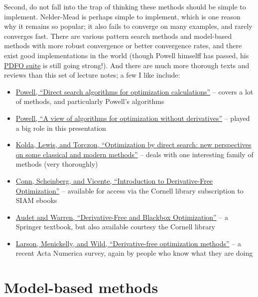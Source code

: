 \documentclass[12pt, leqno]{article} %
\providecommand{\tightlist}{%
  \setlength{\itemsep}{0pt}\setlength{\parskip}{0pt}}
\begin{document}
Second, do not fall into the trap of thinking these methods should be
simple to implement. Nelder-Mead is perhaps simple to implement, which
is one reason why it remains so popular; it also fails to converge on
many examples, and rarely converges fast. There are various pattern
search methods and model-based methods with more robust convergence or
better convergence rates, and there exist good implementations in the
world (though Powell himselff has passed, his
\href{https://www.pdfo.net/}{PDFO suite} is still going strong!). And
there are much more thorough texts and reviews than this set of lecture
notes; a few I like include:

\begin{itemize}
\tightlist
\item
  \href{https://doi.org/10.1017/S0962492900002841}{Powell, ``Direct
  search algorithms for optimization calculations''} -- covers a lot of
  methods, and particularly Powell's algorithms
\item
  \href{http://www.damtp.cam.ac.uk/user/na/NA_papers/NA2007_03.pdf}{Powell,
  ``A view of algorithms for optimization without derivatives''} --
  played a big role in this presentation
\item
  \href{https://epubs.siam.org/doi/10.1137/S003614450242889}{Kolda,
  Lewis, and Torczon, ``Optimization by direct search: new perspectives
  on some classical and modern methods''} -- deals with one interesting
  family of methods (very thoroughly)
\item
  \href{https://epubs-siam-org.proxy.library.cornell.edu/doi/book/10.1137/1.9780898718768}{Conn,
  Scheinberg, and Vicente, ``Introduction to Derivative-Free
  Optimization''} -- available for access via the Cornell library
  subscription to SIAM ebooks
\item
  \href{https://link-springer-com.proxy.library.cornell.edu/book/10.1007/978-3-319-68913-5}{Audet
  and Warren, ``Derivative-Free and Blackbox Optimization''} -- a
  Springer textbook, but also available courtesy the Cornell library
\item
  \href{https://arxiv.org/pdf/1904.11585.pdf}{Larson, Menickelly, and
  Wild, ``Derivative-free optimization methods''} -- a recent Acta
  Numerica survey, again by people who know what they are doing
\end{itemize}

\section{Model-based methods}
\end{document}
